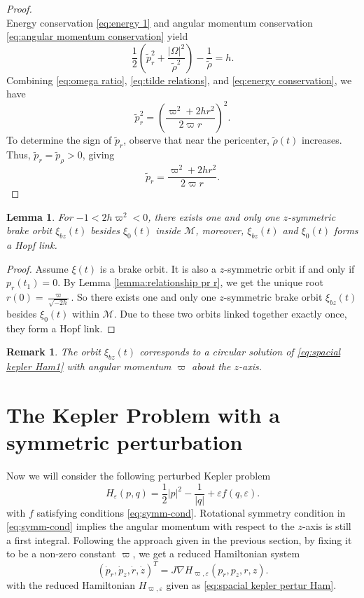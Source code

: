 \documentclass[11pt]{amsart}
\newcommand{\ep}{\varepsilon}
\newcommand{\om}{\varpi}
\newcommand{\ey}{\frac{1}{2}}
\newtheorem{lemma}{Lemma}[section]
\newtheorem{remark}{Remark}[section]
\begin{document}
\begin{proof}
\begin{equation}
	\end{equation} 
	Energy conservation \eqref{eq:energy 1} and angular momentum conservation \eqref{eq:angular momentum conservation} yield  
	\begin{equation}
		\frac{1}{2} \left( \tilde{p}_r^2 + \frac{|\Omega|^2}{\tilde{\rho}^2} \right) - \frac{1}{\tilde{\rho}} = h. \label{eq:energy conservation}
	\end{equation}  
	Combining \eqref{eq:omega ratio}, \eqref{eq:tilde relations}, and \eqref{eq:energy conservation}, we have  
	$$
	\tilde{p}_r^2 = \left( \frac{\om^2 + 2hr^2}{2\om r} \right)^2.  
	$$  
	To determine the sign of $\tilde{p}_r$, observe that near the pericenter, $\tilde{\rho}(t)$ increases. Thus, $\tilde{p}_r = \tilde{p}_\rho > 0$, giving 
	$$
	\tilde{p}_r = \frac{\om^2 + 2hr^2}{2\om r}.  
	$$  
\end{proof}

\begin{lemma}\label{lemma;the existence of bz for Kepler}
	For $-1<2h\om^2<0$, there exists one and only one $z$-symmetric brake orbit $\xi_{bz}(t)$ besides $\xi_0(t)$ inside $\mathcal{M}$, moreover, $\xi_{bz}(t)$ and $\xi_0(t)$ forms a Hopf link.
\end{lemma}
\begin{proof}
	Assume $\xi(t)$ is a brake orbit. It is also a $z$-symmetric orbit if and only if $p_{r}(t_1)=0$. By Lemma  \ref{lemma:relationship pr r}, we get the unique root $r(0)=\frac{\om}{\sqrt{-2h}}$. So there exists one and only one $z$-symmetric brake orbit $\xi_{bz}(t)$ besides $\xi_0(t)$ within $\mathcal{M}$. Due to these two orbits linked together exactly once, they form a Hopf link. 
\end{proof}
\begin{remark}
	The orbit $\xi_{bz}(t)$ corresponds to a circular solution of \eqref{eq:spacial kepler Ham1} with angular momentum $\om$ about the $z$-axis.
\end{remark}


\section{The Kepler Problem with a symmetric perturbation}\label{sec:KPSP}%

Now we will consider the following perturbed Kepler problem
$$ H_{\ep}(p, q) = \ey |p|^2 - \frac{1}{|q|}+\ep f(q, \ep). $$
with $f$ satisfying conditions \eqref{eq;symm-cond}. Rotational symmetry condition in \eqref{eq;symm-cond} implies the angular momentum with respect to the $z$-axis is still a first integral. Following the approach given in the previous section, by fixing it to be a non-zero constant $\om$, we get a reduced Hamiltonian system 
\begin{equation*}
(\dot{p}_r, \dot{p}_z, \dot{r}, \dot{z})^T = J \nabla H_{\om, \ep}(p_r, p_z, r, z).
\end{equation*}
with the reduced Hamiltonian $H_{\om, \ep}$ given as \eqref{eq:spacial kepler pertur Ham}. 
\end{document}
